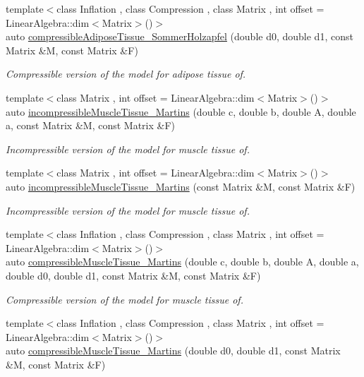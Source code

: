 \begin{DoxyCompactItemize}
{\footnotesize template$<$class Inflation , class Compression , class Matrix , int offset = \-Linear\-Algebra\-::dim$<$\-Matrix$>$()$>$ }\\auto \hyperlink{group__Biomechanics_ga27bb3f7c579ce8c21a69ea4d4d0169d7}{compressible\-Adipose\-Tissue\-\_\-\-Sommer\-Holzapfel} (double d0, double d1, const \-Matrix \&\-M, const \-Matrix \&\-F)
\begin{DoxyCompactList}\small\item\em \-Compressible version of the model for adipose tissue of. \end{DoxyCompactList}\item 
{\footnotesize template$<$class Matrix , int offset = \-Linear\-Algebra\-::dim$<$\-Matrix$>$()$>$ }\\auto \hyperlink{group__Biomechanics_gafcc36a1958899ca9246c4c1b3c9bfd85}{incompressible\-Muscle\-Tissue\-\_\-\-Martins} (double c, double b, double \-A, double a, const \-Matrix \&\-M, const \-Matrix \&\-F)
\begin{DoxyCompactList}\small\item\em \-Incompressible version of the model for muscle tissue of. \end{DoxyCompactList}\item 
{\footnotesize template$<$class Matrix , int offset = \-Linear\-Algebra\-::dim$<$\-Matrix$>$()$>$ }\\auto \hyperlink{group__Biomechanics_ga9e414585a90b1988e9fa88d17d875055}{incompressible\-Muscle\-Tissue\-\_\-\-Martins} (const \-Matrix \&\-M, const \-Matrix \&\-F)
\begin{DoxyCompactList}\small\item\em \-Incompressible version of the model for muscle tissue of. \end{DoxyCompactList}\item 
{\footnotesize template$<$class Inflation , class Compression , class Matrix , int offset = \-Linear\-Algebra\-::dim$<$\-Matrix$>$()$>$ }\\auto \hyperlink{group__Biomechanics_gad831914c493a3da04ed40c3c0ce87a62}{compressible\-Muscle\-Tissue\-\_\-\-Martins} (double c, double b, double \-A, double a, double d0, double d1, const \-Matrix \&\-M, const \-Matrix \&\-F)
\begin{DoxyCompactList}\small\item\em \-Compressible version of the model for muscle tissue of. \end{DoxyCompactList}\item 
{\footnotesize template$<$class Inflation , class Compression , class Matrix , int offset = \-Linear\-Algebra\-::dim$<$\-Matrix$>$()$>$ }\\auto \hyperlink{group__Biomechanics_ga46a70ccb2285e12addad87b6a8aaaae8}{compressible\-Muscle\-Tissue\-\_\-\-Martins} (double d0, double d1, const \-Matrix \&\-M, const \-Matrix \&\-F)

\end{DoxyCompactItemize}
